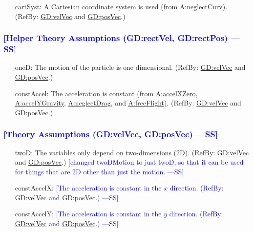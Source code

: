 \documentclass[12pt]{article}
\newcommand{\authornote}[3]{\textcolor{#1}{[#3 ---#2]}}
\newcommand{\authornote}[3]{}
\newcommand{\wss}[1]{\authornote{blue}{SS}{#1}}
\begin{document}
\begin{itemize}
\item[cartSyst:\phantomsection\label{cartSyst}]{A Cartesian coordinate system is used (from \hyperref[neglectCurv]{A:neglectCurv}). (RefBy: \hyperref[GD:velVec]{GD:velVec} and \hyperref[GD:posVec]{GD:posVec}.)}
\end{itemize}

\subsubsection{\wss{Helper Theory Assumptions (GD:rectVel, GD:rectPos)}}

\begin{itemize}
\item[oneD:\phantomsection\label{oneD}]{The motion of the particle is one dimensional. (RefBy: \hyperref[GD:velVec]{GD:velVec} and \hyperref[GD:posVec]{GD:posVec}.)}
\item[constAccel:\phantomsection\label{constAccel}]{The acceleration is constant (from \hyperref[accelXZero]{A:accelXZero}, \hyperref[accelYGravity]{A:accelYGravity}, \hyperref[neglectDrag]{A:neglectDrag}, and \hyperref[freeFlight]{A:freeFlight}). (RefBy: \hyperref[GD:velVec]{GD:velVec} and \hyperref[GD:posVec]{GD:posVec}.)}
\end{itemize}

\subsubsection{\wss{Theory Assumptions (GD:velVec, GD:posVec)}}

\begin{itemize}
\item[twoD:\phantomsection\label{twoD}]{The variables only depend on
two-dimensions (2D). (RefBy: \hyperref[GD:velVec]{GD:velVec} and
\hyperref[GD:posVec]{GD:posVec}.)} \wss{changed twoDMotion to just twoD, so that
it can be used for things that are 2D other than just the motion.}
\item[constAccelX:\phantomsection\label{constAccelX}]{\wss{The acceleration is constant in the $x$ direction. (RefBy: \hyperref[GD:velVec]{GD:velVec} and \hyperref[GD:posVec]{GD:posVec}.)}}
\item[constAccelY:\phantomsection\label{constAccelY}]{\wss{The acceleration is constant in the $y$ direction. (RefBy: \hyperref[GD:velVec]{GD:velVec} and \hyperref[GD:posVec]{GD:posVec}.)}}

\end{itemize}
\end{document}

